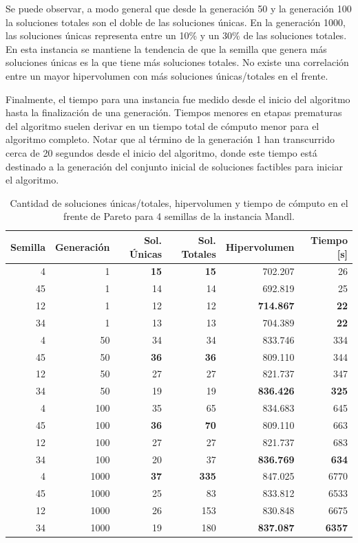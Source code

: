Se puede observar, a modo general que desde la generación 50 y la generación 100 la soluciones totales son el doble de las soluciones únicas. En la generación 1000, las soluciones únicas representa entre un 10\% y un 30\% de las soluciones totales. En esta instancia se mantiene la tendencia de que la semilla que genera más soluciones únicas es la que tiene más soluciones totales. No existe una correlación entre un mayor hipervolumen con más soluciones únicas/totales en el frente. 

Finalmente, el tiempo para una instancia fue medido desde el inicio del algoritmo hasta la finalización de una generación. Tiempos menores en etapas prematuras del algoritmo suelen derivar en un tiempo total de cómputo menor para el algoritmo completo. Notar que al término de la generación 1 han transcurrido cerca de 20 segundos desde el inicio del algoritmo, donde este tiempo está destinado a la generación del conjunto inicial de soluciones factibles para iniciar el algoritmo.

\begin{table}[!htb]
\centering
\begin{tabular}{|r|r|r|r|r|r|}
\hline
Semilla & Generación & Sol. Únicas & Sol. Totales & Hipervolumen & Tiempo [s]\\ 
\hline \hline
4 & 1 & \textbf{15} & \textbf{15} & 702.207 & 26 \\ \hline
45 & 1 & 14 & 14 & 692.819 & 25 \\ \hline
12 & 1 & 12 & 12 & \textbf{714.867} & \textbf{22} \\ \hline
34 & 1 & 13 & 13 & 704.389 & \textbf{22} \\ \hline \hline
4 & 50 & 34 & 34 & 833.746 & 334 \\ \hline
45 & 50 & \textbf{36} & \textbf{36} & 809.110 & 344 \\ \hline
12 & 50 & 27 & 27 & 821.737 & 347 \\ \hline
34 & 50 & 19 & 19 & \textbf{836.426} & \textbf{325} \\ \hline\hline
4 & 100 & 35 & 65 & 834.683 & 645 \\ \hline
45 & 100 & \textbf{36} & \textbf{70} & 809.110 & 663 \\ \hline
12 & 100 & 27 & 27 & 821.737 & 683 \\ \hline
34 & 100 & 20 & 37 & \textbf{836.769} & \textbf{634} \\ \hline \hline
4 & 1000 & \textbf{37} & \textbf{335} & 847.025 & 6770 \\ \hline
45 & 1000 & 25 & 83 & 833.812 & 6533 \\ \hline
12 & 1000 & 26 & 153 & 830.848 & 6675 \\ \hline
34 & 1000 & 19 & 180 & \textbf{837.087} & \textbf{6357} \\ \hline
\end{tabular}
\caption{Cantidad de soluciones únicas/totales, hipervolumen y tiempo de cómputo en el frente de Pareto para 4 semillas de la instancia Mandl.}
\label{tab:dataFrenteMandl}
\end{table}

